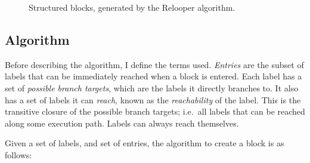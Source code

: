 \documentclass[00-main.tex]{subfiles}
\begin{document}
\begin{figure}[t]
  \centering
  \caption{Structured blocks, generated by the Relooper algorithm.}
  \label{fig:relooper output blocks structure} %
\end{figure}

\subsection{Algorithm}\label{sec:prep:relooper algorithm}

Before describing the algorithm, I define the terms used.
\emph{Entries} are the subset of labels that can be immediately reached when a block is entered.
Each label has a set of \emph{possible branch targets}, which are the labels it directly branches to.
It also has a set of labels it can \emph{reach}, known as the \emph{reachability} of the label.
This is the transitive closure of the possible branch targets; i.e.\ all labels that can be reached along some execution path.
Labels can always reach themselves.

Given a set of labels, and set of entries, the algorithm to create a block is as follows:
\end{document}
